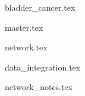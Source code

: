 {bladder_cancer.tex}

\pagebreak

{master.tex}

{network.tex}

{data_integration.tex}

{network_notes.tex}


